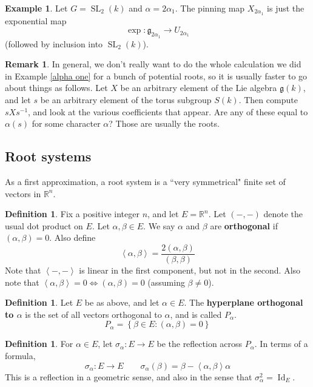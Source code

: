\documentclass[12pt]{article}
\theoremstyle{definition}
\newtheorem{definition}[theorem]{Definition}
\newtheorem{example}[theorem]{Example}
\newtheorem{remark}[theorem]{Remark}
\newcommand{\R}{\mathbb{R}}
\newcommand{\sig}{\sigma}
\newcommand{\lb}{\left\{}
\newcommand{\rb}{\right\}}
\newcommand{\la}{\left\langle}
\newcommand{\ra}{\right\rangle}
\newcommand{\tbf}{\textbf}
\newcommand{\inv}{^{-1}}
\newcommand{\frakg}{\mathfrak{g}}
\DeclareMathOperator{\SL}{SL}
\DeclareMathOperator{\Id}{Id}
\begin{document}
\begin{example}
Let $G = \SL_2(k)$ and $\alpha = 2\alpha_1$. The pinning map $X_{2\alpha_1}$ is just the exponential map
\[
	\exp:\frakg_{2\alpha_1} \to U_{2\alpha_1}
\]
(followed by inclusion into $\SL_2(k)$).
\end{example}

\begin{remark}
In general, we don't really want to do the whole calculation we did in Example \ref{alpha one} for a bunch of potential roots, so it is usually faster to go about things as follows. Let $X$ be an arbitrary element of the Lie algebra $\frakg(k)$, and let $s$ be an arbitrary element of the torus subgroup $S(k)$. Then compute $sXs \inv$, and look at the various coefficients that appear. Are any of these equal to $\alpha(s)$ for some character $\alpha$? Those are usually the roots.
\end{remark}

\subsection{Root systems}
\label{root systems}

As a first approximation, a root system is a ``very symmetrical" finite set of vectors in $\R^n$.

\begin{definition}
Fix a positive integer $n$, and let $E = \R^n$. Let $(-,-)$ denote the usual dot product on $E$. Let $\alpha, \beta \in E$. We say $\alpha$ and $\beta$ are \tbf{orthogonal} if $(\alpha, \beta) = 0$. Also define
\[
	\la \alpha, \beta \ra = \frac{2(\alpha, \beta)}{(\beta, \beta)}
\]
Note that $\la -, - \ra$ is linear in the first component, but not in the second. Also note that $\la \alpha, \beta \ra = 0 \iff (\alpha, \beta) = 0$ (assuming $\beta \neq 0$).
\end{definition}

\begin{definition}
Let $E$ be as above, and let $\alpha \in E$. The \tbf{hyperplane orthogonal to $\alpha$} is the set of all vectors orthogonal to $\alpha$, and is called $P_\alpha$.
\[
	P_\alpha = \lb \beta \in E : (\alpha, \beta) = 0 \rb
\]
\end{definition}

\begin{definition}
For $\alpha \in E$, let $\sig_\alpha:E \to E$ be the reflection across $P_\alpha$. In terms of a formula,
\[
	\sig_\alpha:E \to E \qquad \sig_\alpha(\beta) = \beta - \la \alpha, \beta \ra \alpha
\]
This is a reflection in a geometric sense, and also in the sense that $\sig_\alpha^2 = \Id_E$.
\end{definition}
\end{document}
